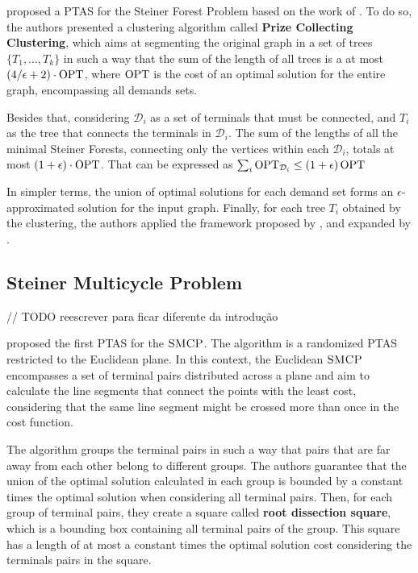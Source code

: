 \cite{Bateni} proposed a PTAS for the Steiner Forest Problem based on the work of \cite{Borradaile2009b}. To do so, the authors presented a clustering algorithm called \textbf{Prize Collecting Clustering}, which aims at segmenting the original graph in a set of trees \(\{T_1, \dots, T_k\}\) in such a way that the sum of the length of all trees is a at most \((4/\epsilon + 2) \cdot \operatorname{\textrm{OPT}}\), where \(\operatorname{\textrm{OPT}}\) is the cost of an optimal solution for the entire graph, encompassing all demands sets.

Besides that, considering \(\mathcal{D}_i\) as a set of terminals that must be connected, and \(T_i\) as the tree that connects the terminals in \(\mathcal{D}_i\). The sum of the lengths of all the minimal Steiner Forests, connecting only the vertices within each \(\mathcal{D}_i\), totals at most \((1 + \epsilon) \cdot \operatorname{\textrm{OPT}}\). That can be expressed as \(\sum_i \operatorname{\textrm{OPT}}_{\mathcal{D}_i} \leq (1 + \epsilon) \operatorname{\textrm{OPT}}\)

In simpler terms, the union of optimal solutions for each demand set forms an \(\epsilon\)-approximated solution for the input graph. Finally, for each tree \(T_i\) obtained by the clustering, the authors applied the framework proposed by \cite{KleinTSP}, and expanded by \cite{Borradaile2009b, Borradaile2012}.

\subsection{Steiner Multicycle Problem}

// TODO reescrever para ficar diferente da introdução

\cite{LINTZMAYER2020134} proposed the first PTAS for the \(\textsc{SMCP}\). The algorithm is a randomized PTAS restricted to the Euclidean plane. In this context, the Euclidean \(\textsc{SMCP}\) encompasses a set of terminal pairs distributed across a plane and aim to calculate the line segments that connect the points with the least cost, considering that the same line segment might be crossed more than once in the cost function.

The algorithm groups the terminal pairs in such a way that pairs that are far away from each other belong to different groups. The authors guarantee that the union of the optimal solution calculated in each group is bounded by a constant times the optimal solution when considering all terminal pairs. Then, for each group of terminal pairs, they create a square called \textbf{root dissection square}, which is a bounding box containing all terminal pairs of the group. This square has a length of at most a constant times the optimal solution cost considering the terminals pairs in the square.

